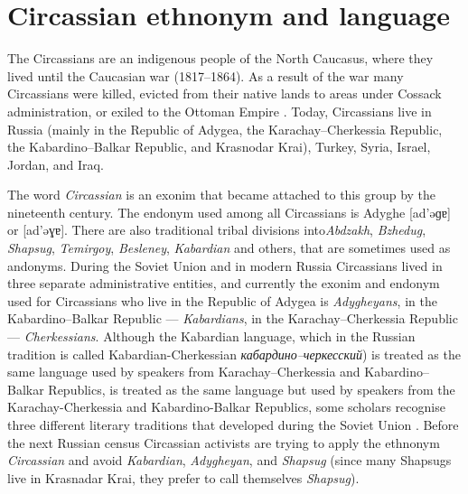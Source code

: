 \section{Circassian ethnonym and language}
\par The Circassians are an indigenous people of the North Caucasus, where they lived until the Caucasian war (1817--1864). As a result of the war many Circassians were killed, evicted from their native lands to areas under Cossack administration, or exiled to the Ottoman Empire \citep{shenfield99, richmond13}. Today, Circassians live in Russia (mainly in the Republic of Adygea, the Karachay--Cherkessia Republic,  the Kabardino--Balkar Republic, and Krasnodar Krai), Turkey, Syria, Israel, Jordan, and Iraq.
\par The word \textit{Circassian} is an exonim that became attached to this group by the nineteenth century. The endonym used among all Circassians is Adyghe [ad'əɡɐ] or [ad'əɣɐ]. There are also traditional tribal divisions into\textit{Abdzakh}, \textit{Bzhedug},  \textit{Shapsug}, \textit{Temirgoy}, \textit{Besleney}, \textit{Kabardian} and others, that are sometimes used as andonyms. During the Soviet Union and in modern Russia Circassians lived in three separate administrative entities, and currently the exonim and endonym used for Circassians who live in the Republic of Adygea is \textit{Adygheyans}, in the Kabardino--Balkar Republic --- \textit{Kabardians}, in the Karachay--Cherkessia Republic --- \textit{Cherkessians}. Although the Kabardian language, which in the Russian tradition is called Kabardian-Cherkessian \textit{кабардино--черкесский}) is treated as the same language used by speakers from Karachay--Cherkessia and Kabardino--Balkar Republics, is treated as the same language but used by speakers from the Karachay-Cherkessia and Kabardino-Balkar Republics, some scholars recognise three different literary traditions that developed during the Soviet Union \cite[46--47]{alkhasova15}. Before the next Russian census Circassian activists are trying to apply the ethnonym \textit{Circassian} and avoid \textit{Kabardian}, \textit{Adygheyan}, and \textit{Shapsug} (since many Shapsugs live in Krasnadar Krai, they prefer to call themselves \textit{Shapsug}).
